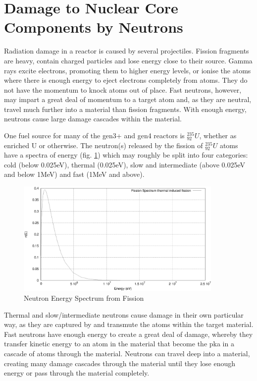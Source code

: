 \FloatBarrier
\section{Damage to Nuclear Core Components by Neutrons}

Radiation damage in a reactor is caused by several projectiles.  Fission fragments are heavy, contain charged particles and lose energy close to their source.  Gamma rays excite electrons, promoting them to higher energy levels, or ionise the atoms where there is enough energy to eject electrons completely from atoms.  They do not have the momentum to knock atoms out of place.  Fast neutrons, however, may impart a great deal of momentum to a target atom and, as they are neutral, travel much further into a material than fission fragments.  With enough energy, neutrons cause large damage cascades within the material.

One fuel source for many of the \acrshort{gen3+} and \acrshort{gen4} reactors is ${}^{235}_{92}U$, whether as enriched U or otherwise.  The neutron(s) released by the fission of ${}^{235}_{92}U$ atoms have a spectra of energy (fig. \ref{fig:neutronfissionspectra}) which may roughly be split into four categories: cold (below 0.025eV), thermal (0.025eV), slow and intermediate (above 0.025eV and below 1MeV) and fast (1MeV and above).

\begin{figure}[htbp]
  \begin{center}
    \includegraphics[width=10.0cm]{chapters/introduction/plots/fission_spectra/fission_spectra.eps}
    \caption{Neutron Energy Spectrum from Fission\cite{jeff311}}
    \label{fig:neutronfissionspectra}
  \end{center}
\end{figure}

Thermal and slow/intermediate neutrons cause damage in their own particular way, as they are captured by and transmute the atoms within the target material.  Fast neutrons have enough energy to create a great deal of damage, whereby they transfer kinetic energy to an atom in the material that become the \acrfull{pka} in a cascade of atoms through the material.  Neutrons can travel deep into a material, creating many damage cascades through the material until they lose enough  energy or pass through the material completely.

